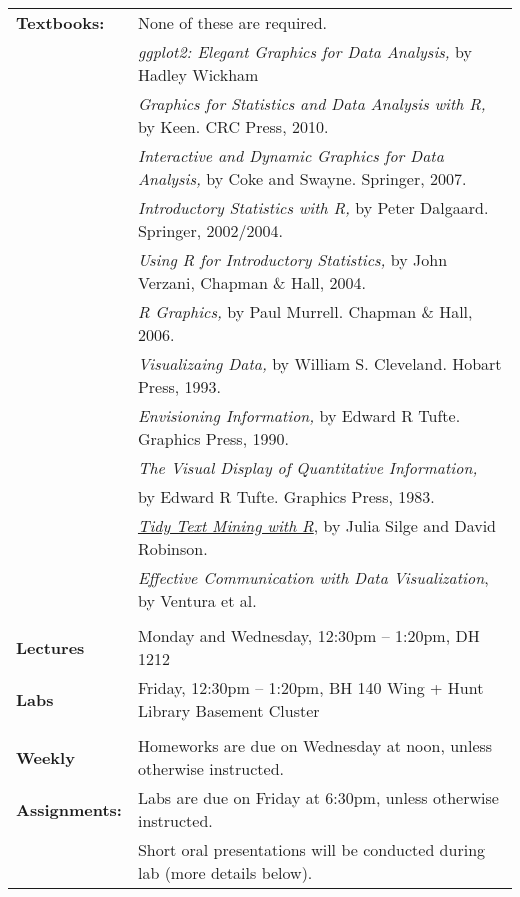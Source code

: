 \documentclass[11pt]{article}
\begin{document}
\begin{tabular}{ll}
{\bf Textbooks:} 
& None of these are required.\\
& {\it ggplot2: Elegant Graphics for Data Analysis,} by Hadley Wickham\\
& {\it Graphics for Statistics and Data Analysis with R,} by Keen.  CRC Press, 2010.\\
& {\it Interactive and Dynamic Graphics for Data Analysis,} by Coke and Swayne.  Springer, 2007.\\
& {\it Introductory Statistics with R,} by Peter Dalgaard.  Springer, 2002/2004.\\
& {\it Using R for Introductory Statistics,} by John Verzani, Chapman \& Hall, 2004.\\
& {\it R Graphics,} by Paul Murrell.  Chapman \& Hall, 2006.\\
& {\it Visualizaing Data,} by William S. Cleveland.  Hobart Press, 1993.\\
& {\it Envisioning Information,} by Edward R Tufte.  Graphics Press, 1990.\\
& {\it The Visual Display of Quantitative Information,} \\ & by Edward R Tufte.  Graphics Press, 1983.\\
& {\it \href{http://tidytextmining.com/}{Tidy Text Mining with R}}, by Julia Silge and David Robinson.\\
& {\it Effective Communication with Data Visualization}, by Ventura et al.\\
& \\



{\bf Lectures}
& Monday and Wednesday, 12:30pm -- 1:20pm, DH 1212\\


{\bf Labs}
& Friday, 12:30pm -- 1:20pm, BH 140 Wing + Hunt Library Basement Cluster\\

\vspace*{.05in}\\



 {\bf Weekly} & Homeworks are due on Wednesday at noon, unless otherwise instructed.\\
 {\bf Assignments:}
& Labs are due on Friday at 6:30pm, unless otherwise instructed.\\
& Short oral presentations will be conducted during lab (more details below).\\


\end{tabular}
\end{document}

